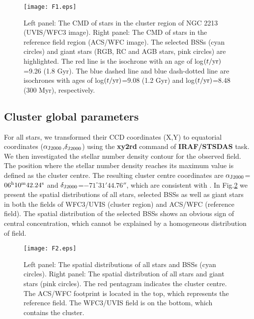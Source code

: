 \documentclass[useAMS,usenatbib,twocolumn]{mnras}
\begin{document}
\begin{figure*}
  \centering
  \texttt{[image: F1.eps]}
  \caption{Left panel: The CMD of stars in the cluster region of NGC 2213 (UVIS/WFC3 image). Right panel: The CMD of stars in the reference field region (ACS/WFC image). The  selected BSSs (cyan circles) and giant stars (RGB, RC and AGB stars, pink circles) are highlighted. The red line is the isochrone with an age of log$(t/{\rm yr})$=9.26 (1.8 Gyr). The blue dashed line and blue dash-dotted line are isochrones with ages of log$(t/{\rm yr})$=9.08 (1.2 Gyr) and log$(t/{\rm yr})$=8.48 (300 Myr), respectively.}\label{F1}
\end{figure*}

\subsection{Cluster global parameters}
For all stars, we transformed their CCD coordinates (X,Y) to equatorial coordinates ($\alpha_{\rm J2000}$,$\delta_{\rm J2000}$) using the {\bf xy2rd} command of {\bf IRAF/STSDAS} task. 
We then investigated the stellar number density contour for the observed field. The position where the stellar number density reaches its maximum value is defined as the cluster centre. The resulting cluster centre coordinates are $\alpha_{\rm J2000}$=$06^{\rm h}10^{\rm m}42.24^{\rm s}$ and $\delta_{\rm J2000}$=$-71^{\circ}31'44.76''$, which are consistent with \cite{Baum13a}. In Fig.\ref{F2} we present the spatial distributions of all stars, selected BSSs as well as giant stars in both the fields of WFC3/UVIS (cluster region) and ACS/WFC (reference field). The spatial distribution of the selected BSSs shows an obvious sign of central concentration, which cannot be explained by a homogeneous distribution of field. 

\begin{figure*}
  \centering
  \texttt{[image: F2.eps]}
  \caption{Left panel: The spatial distributions of all stars and BSSs (cyan circles). Right panel: The spatial distribution of all stars and giant stars (pink circles). The red pentagram indicates the cluster centre. The ACS/WFC footprint is located in the top, which represents the reference field. The WFC3/UVIS field is on the bottom, which contains the cluster.}\label{F2}
\end{figure*}
\end{document}
